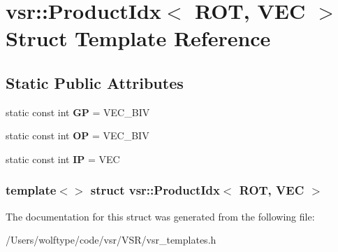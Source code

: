 \hypertarget{structvsr_1_1_product_idx_3_01_r_o_t_00_01_v_e_c_01_4}{\section{vsr\-:\-:Product\-Idx$<$ R\-O\-T, V\-E\-C $>$ Struct Template Reference}
\label{structvsr_1_1_product_idx_3_01_r_o_t_00_01_v_e_c_01_4}
}
\subsection*{Static Public Attributes}
\begin{DoxyCompactItemize}
\item 
\hypertarget{structvsr_1_1_product_idx_3_01_r_o_t_00_01_v_e_c_01_4_a26745c73426a873d581d633c81cbab8d}{static const int {\bfseries G\-P} = V\-E\-C\-\_\-\-B\-I\-V}\label{structvsr_1_1_product_idx_3_01_r_o_t_00_01_v_e_c_01_4_a26745c73426a873d581d633c81cbab8d}

\item 
\hypertarget{structvsr_1_1_product_idx_3_01_r_o_t_00_01_v_e_c_01_4_a3e02938549f21bfd2cc34797604dfed3}{static const int {\bfseries O\-P} = V\-E\-C\-\_\-\-B\-I\-V}\label{structvsr_1_1_product_idx_3_01_r_o_t_00_01_v_e_c_01_4_a3e02938549f21bfd2cc34797604dfed3}

\item 
\hypertarget{structvsr_1_1_product_idx_3_01_r_o_t_00_01_v_e_c_01_4_a290593bf13d8ff73d2f52f62eb4e3325}{static const int {\bfseries I\-P} = V\-E\-C}\label{structvsr_1_1_product_idx_3_01_r_o_t_00_01_v_e_c_01_4_a290593bf13d8ff73d2f52f62eb4e3325}

\end{DoxyCompactItemize}
\subsubsection*{template$<$$>$ struct vsr\-::\-Product\-Idx$<$ R\-O\-T, V\-E\-C $>$}



The documentation for this struct was generated from the following file\-:\begin{DoxyCompactItemize}
\item 
/\-Users/wolftype/code/vsr/\-V\-S\-R/vsr\-\_\-templates.\-h\end{DoxyCompactItemize}
